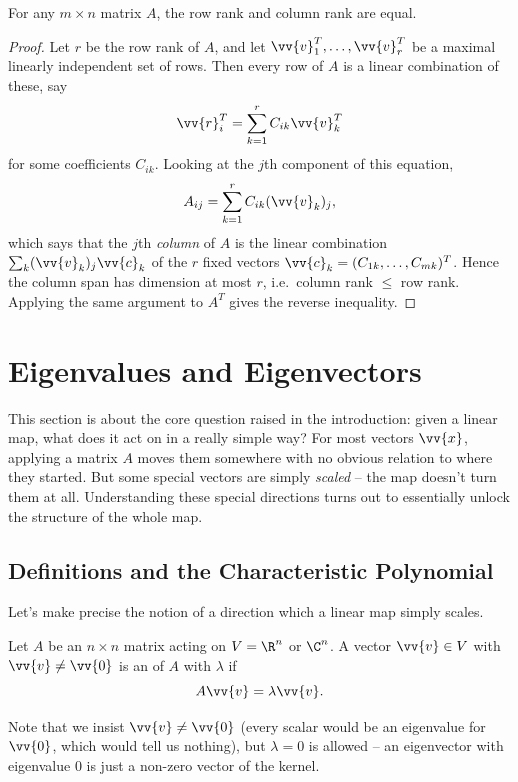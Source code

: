 \begin{theorem}
	For any $m \times n$ matrix $A$, the row rank and column rank are equal.
\end{theorem}
\begin{proof}
	Let $r$ be the row rank of $A$, and let $\vv{v}_1^T, \dots, \vv{v}_r^T$ be a maximal linearly independent set of rows. Then every row of $A$ is a linear combination of these, say
	$$
	\vv{r}_i^T = \sum_{k = 1}^r C_{ik}\vv{v}_k^T
	$$
	for some coefficients $C_{ik}$. Looking at the $j$th component of this equation,
	$$
	A_{ij} = \sum_{k=1}^r C_{ik}(\vv{v}_k)_j,
	$$
	which says that the $j$th \emph{column} of $A$ is the linear combination $\sum_k (\vv{v}_k)_j \vv{c}_k$ of the $r$ fixed vectors $\vv{c}_k = (C_{1k}, \dots, C_{mk})^T$. Hence the column span has dimension at most $r$, i.e.\ column rank $\leq$ row rank. Applying the same argument to $A^T$ gives the reverse inequality.
\end{proof}

\section{Eigenvalues and Eigenvectors}

This section is about the core question raised in the introduction: given a linear map, what does it act on in a really simple way? For most vectors $\vv{x}$, applying a matrix $A$ moves them somewhere with no obvious relation to where they started. But some special vectors are simply \emph{scaled} -- the map doesn't turn them at all. Understanding these special directions turns out to essentially unlock the structure of the whole map.

\subsection{Definitions and the Characteristic Polynomial}

Let's make precise the notion of a direction which a linear map simply scales.

\begin{definition}
	Let $A$ be an $n \times n$ matrix acting on $V = \R^n$ or $\C^n$. A vector $\vv{v} \in V$ with $\vv{v} \neq \vv{0}$ is an  of $A$ with  $\lambda$ if
	$$
	A \vv{v} = \lambda \vv{v}.
	$$
\end{definition}

Note that we insist $\vv{v} \neq \vv{0}$ (every scalar would be an eigenvalue for $\vv{0}$, which would tell us nothing), but $\lambda = 0$ is allowed -- an eigenvector with eigenvalue $0$ is just a non-zero vector of the kernel.

